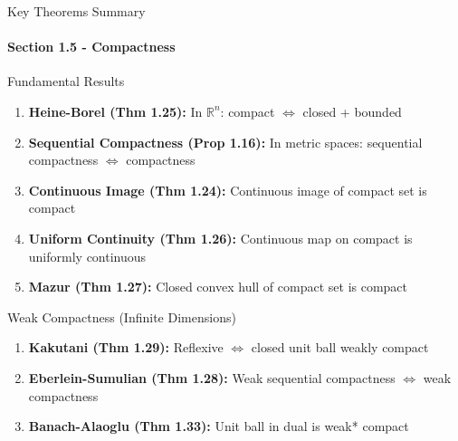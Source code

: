 \documentclass[aspectratio=169,10pt]{beamer}
\theoremstyle{definition}
\begin{document}
\begin{frame}{Key Theorems Summary}
\framesubtitle{Section 1.5 - Compactness}

\begin{block}{Fundamental Results}
\begin{enumerate}
    \item \textbf{Heine-Borel (Thm 1.25):} In $\mathbb{R}^n$: compact $\iff$ closed + bounded

    \item \textbf{Sequential Compactness (Prop 1.16):} In metric spaces: sequential compactness $\iff$ compactness

    \item \textbf{Continuous Image (Thm 1.24):} Continuous image of compact set is compact

    \item \textbf{Uniform Continuity (Thm 1.26):} Continuous map on compact is uniformly continuous

    \item \textbf{Mazur (Thm 1.27):} Closed convex hull of compact set is compact
\end{enumerate}
\end{block}

\vspace{0.2cm}

\begin{block}{Weak Compactness (Infinite Dimensions)}
\begin{enumerate}
    \item \textbf{Kakutani (Thm 1.29):} Reflexive $\iff$ closed unit ball weakly compact

    \item \textbf{Eberlein-Sumulian (Thm 1.28):} Weak sequential compactness $\iff$ weak compactness

    \item \textbf{Banach-Alaoglu (Thm 1.33):} Unit ball in dual is weak* compact
\end{enumerate}
\end{block}
\end{frame}
\end{document}
